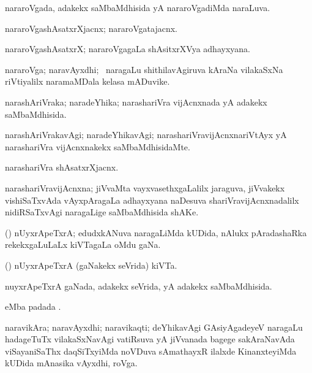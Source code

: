 \bentry
{}
\gl{\gu}
\bmng
nararoVgada, adakekx saMbaMdhisida yA nararoVgadiMda naraLuva. 
\emng
\eentry

\bentry
{}
\gl{\nA}
\bmng
nararoVgashAsatxrXjacnx; nararoVgatajacnx. 
\emng
\eentry

\bentry
{}
\gl{\nA}
\bmng
nararoVgashAsatxrX; nararoVgagaLa shAsitxrXVya adhayxyana. 
\emng
\eentry

\bentry
{}
\gl{\nA}
\bmng
nararoVga; naravAyxdhi; \sA\ naragaLu shithilavAgiruva kAraNa vilakaSxNa riVtiyalilx naramaMDala kelasa mADuvike. 
\emng
\eentry

\bentry
{}
\gl{\gu}
\bmng
narashAriVraka; naradeYhika; narashariVra vijAcnxnada yA adakekx saMbaMdhisida. 
\emng
\eentry

\bentry
{}
\gl{\kirxvi}
\bmng
narashAriVrakavAgi; naradeYhikavAgi; narashariVravijAcnxnariVtAyx yA narashariVra vijAcnxnakekx saMbaMdhisidaMte. 
\emng
\eentry

\bentry
{}
\gl{\nA}
\bmng
narashariVra shAsatxrXjacnx. 
\emng
\eentry

\bentry
{}
\gl{\nA}
\bmng
narashariVravijAcnxna; jiVvaMta vayxvasethxgaLalilx jaraguva, jiVvakekx vishiSaTxvAda vAyxpAragaLa adhayxyana naDesuva shariVravijAcnxnadalilx nidiRSaTxvAgi naragaLige saMbaMdhisida shAKe. 
\emng
\eentry

\bentry
{}
\gl{\nA}
\bmng
(\jiVvi) nUyxrApeTxrA; edudxkANuva naragaLiMda kUDida, nAlukx pAradashaRka rekekxgaLuLaLx kiVTagaLa oMdu gaNa. 
\emng
\eentry

\bentry
{}
\gl{\nA}
\bmng
(\jiVvi) nUyxrApeTxrA (gaNakekx seVrida) kiVTa. 
\emng
\eentry

\bentry
{}
\gl{\gu}
\bmng
nuyxrApeTxrA gaNada, adakekx seVrida, yA adakekx saMbaMdhisida. 
\emng
\eentry

\bentry
{}
\gl{\nA}
\bmng
{} eMba padada \bava. 
\emng
\eentry

\bentry
{}
\gl{\nA}
\bmng
 naravikAra; naravAyxdhi; naravikaqti; deYhikavAgi GAsiyAgadeyeV naragaLu hadageTuTx vilakaSxNavAgi vatiRsuva yA jiVvanada bagege sakAraNavAda viSayaniSaThx daqSiTxyiMda noVDuva sAmathayxR ilalxde KinanxteyiMda kUDida mAnasika vAyxdhi, roVga. 
\emng
\eentry


